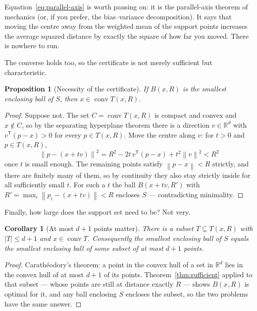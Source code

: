 \documentclass[11pt,a4paper]{article}
\theoremstyle{plain}
\newtheorem{proposition}[theorem]{Proposition}
\newtheorem{corollary}[theorem]{Corollary}
\theoremstyle{definition}
\theoremstyle{remark}
\DeclareMathOperator{\conv}{conv}
\newcommand{\R}{\mathbb{R}}
\newcommand{\norm}[1]{\left\lVert #1 \right\rVert}
\newcommand{\transpose}{^{\mathsf{T}}}
\begin{document}
Equation~\eqref{eq:parallel-axis} is worth pausing on: it is the parallel-axis
theorem of mechanics (or, if you prefer, the bias--variance decomposition). It
says that moving the centre away from the weighted mean of the support points
increases the average squared distance by exactly the square of how far you
moved. There is nowhere to run.

The converse holds too, so the certificate is not merely sufficient but
characteristic.

\begin{proposition}[Necessity of the certificate]
  \label{prop:necessary}
  If $B(x,R)$ is the smallest enclosing ball of $S$, then $x\in\conv T(x,R)$.
\end{proposition}

\begin{proof}
  Suppose not. The set $C=\conv T(x,R)$ is compact and convex and $x\notin C$, so
  by the separating hyperplane theorem there is a direction $v\in\R^d$ with
  $v\transpose(p-x) > 0$ for every $p\in T(x,R)$. Move the centre along $v$:
  for $t>0$ and $p\in T(x,R)$,
  \[
    \norm{p-(x+tv)}^2 = R^2 - 2t\,v\transpose(p-x) + t^2\norm{v}^2 < R^2
  \]
  once $t$ is small enough. The remaining points satisfy $\norm{p-x} < R$
  strictly, and there are finitely many of them, so by continuity they also stay
  strictly inside for all sufficiently small $t$. For such a $t$ the ball
  $B(x+tv, R')$ with $R' = \max_i \norm{p_i - (x+tv)} < R$ encloses $S$ ---
  contradicting minimality.
\end{proof}

Finally, how large does the support set need to be? Not very.

\begin{corollary}[At most $d+1$ points matter]
  \label{cor:caratheodory}
  There is a subset $T \subseteq T(x,R)$ with $\lvert T\rvert \le d+1$ and
  $x\in\conv T$. Consequently the smallest enclosing ball of $S$ equals the
  smallest enclosing ball of some subset of at most $d+1$ points.
\end{corollary}

\begin{proof}
  Carath\'eodory's theorem: a point in the convex hull of a set in $\R^d$ lies in
  the convex hull of at most $d+1$ of its points. Theorem~\ref{thm:sufficient}
  applied to that subset --- whose points are still at distance exactly $R$ ---
  shows $B(x,R)$ is optimal for it, and any ball enclosing $S$ encloses the
  subset, so the two problems have the same answer.
\end{proof}
\end{document}
